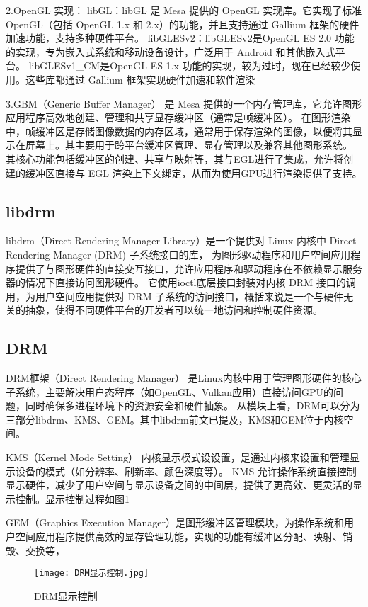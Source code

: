 2.OpenGL 实现：
libGL：libGL 是 Mesa 提供的 OpenGL 实现库。它实现了标准 OpenGL（包括 OpenGL 1.x 和 2.x）的功能，并且支持通过 Gallium 框架的硬件加速功能，支持多种硬件平台。
libGLESv2：libGLESv2是OpenGL ES 2.0 功能的实现，专为嵌入式系统和移动设备设计，广泛用于 Android 和其他嵌入式平台。
libGLESv1\_CM是OpenGL ES 1.x 功能的实现，较为过时，现在已经较少使用。这些库都通过 Gallium 框架实现硬件加速和软件渲染

3.GBM（Generic Buffer Manager） 是 Mesa 提供的一个内存管理库，它允许图形应用程序高效地创建、管理和共享显存缓冲区（通常是帧缓冲区）。
在图形渲染中，帧缓冲区是存储图像数据的内存区域，通常用于保存渲染的图像，以便将其显示在屏幕上。其主要用于跨平台缓冲区管理、显存管理以及兼容其他图形系统。
其核心功能包括缓冲区的创建、共享与映射等，其与EGL进行了集成，允许将创建的缓冲区直接与 EGL 渲染上下文绑定，从而为使用GPU进行渲染提供了支持。

\subsection{libdrm}
libdrm（Direct Rendering Manager Library）是一个提供对 Linux 内核中 Direct Rendering Manager (DRM) 子系统接口的库，
为图形驱动程序和用户空间应用程序提供了与图形硬件的直接交互接口，允许应用程序和驱动程序在不依赖显示服务器的情况下直接访问图形硬件。
它使用ioctl底层接口封装对内核 DRM 接口的调用，为用户空间应用提供对 DRM 子系统的访问接口，概括来说是一个与硬件无关的抽象，使得不同硬件平台的开发者可以统一地访问和控制硬件资源。

\subsection{DRM} 
DRM框架（Direct Rendering Manager） 是Linux内核中用于管理图形硬件的核心子系统，主要解决用户态程序（如OpenGL、Vulkan应用）直接访问GPU的问题，同时确保多进程环境下的资源安全和硬件抽象。
从模块上看，DRM可以分为三部分libdrm、KMS、GEM。其中libdrm前文已提及，KMS和GEM位于内核空间。

KMS（Kernel Mode Setting） 内核显示模式设设置，是通过内核来设置和管理显示设备的模式（如分辨率、刷新率、颜色深度等）。
KMS 允许操作系统直接控制显示硬件，减少了用户空间与显示设备之间的中间层，提供了更高效、更灵活的显示控制。显示控制过程如图\ref{fig:DRM显示控制}

GEM（Graphics Execution Manager）是图形缓冲区管理模块，为操作系统和用户空间应用程序提供高效的显存管理功能，实现的功能有缓冲区分配、映射、销毁、交换等，


\begin{figure}[h]
  \centering
  \texttt{[image: DRM显示控制.jpg]}
  \caption{DRM显示控制}
  \label{fig:DRM显示控制}
\end{figure}

